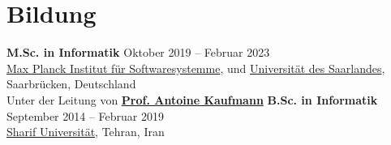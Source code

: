 \documentclass[../main.tex]{subfiles}
\begin{document}
\section{Bildung}
\begin{category}
    \citembullet \textbf{M.Sc. in Informatik} \hfill Oktober 2019 -- Februar 2023\\
    \href{https://mpi-sws.org}{Max Planck Institut für Softwaresystemme}, und 
    \href{https://www.uni-saarland.de/start.html}{Universität des Saarlandes}, Saarbrücken, Deutschland\\
    Unter der Leitung von \href{https://people.mpi-sws.org/~antoinek/}{\textbf{Prof. Antoine Kaufmann}}
    \citembullet \textbf{B.Sc. in Informatik} \hfill September 2014 -- Februar 2019 \\
    \href{http://www.en.sharif.edu/}{Sharif Universität}, Tehran, Iran 
\end{category}
\end{document}
